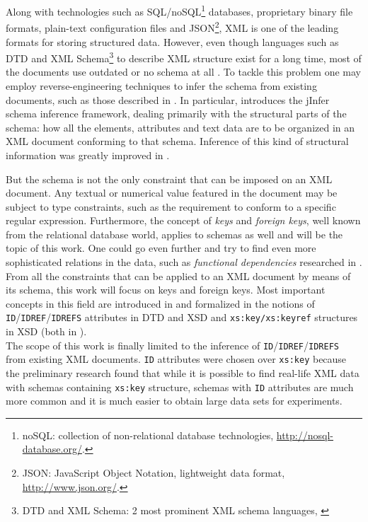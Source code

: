 \label{chapter-preface}

Along with technologies such as SQL/noSQL\footnote{noSQL: collection of non-relational database technologies, \url{http://nosql-database.org/}.} databases, proprietary binary file formats, plain-text configuration files and JSON\footnote{JSON: JavaScript Object Notation, lightweight data format, \url{http://www.json.org/}.}, XML is one of the leading formats for storing structured data. However, even though languages such as DTD and XML Schema\footnote{DTD and XML Schema: 2 most prominent XML schema languages, \cite{Bray:08:EML}} to describe XML structure exist for a long time, most of the documents use outdated or no schema at all \cite{1802522}. To tackle this problem one may employ reverse-engineering techniques to infer the schema from existing documents, such as those described in \cite{ahonen, bex, vyhnanovska}. In particular, \cite{archdoc} introduces the jInfer schema inference framework, dealing primarily with the structural parts of the schema: how all the elements, attributes and text data are to be organized in an XML document conforming to that schema. Inference of this kind of structural information was greatly improved in \cite{anti}.\\


But the schema is not the only constraint that can be imposed on an XML document. Any textual or numerical value featured in the document may be subject to type constraints, such as the requirement to conform to a specific regular expression. Furthermore, the concept of \textit{keys} and \textit{foreign keys}, well known from the relational database world, applies to schemas as well and will be the topic of this work. One could go even further and try to find even more sophisticated relations in the data, such as \textit{functional dependencies} researched in \cite{sviro}.\\

From all the constraints that can be applied to an XML document by means of its schema, this work will focus on keys and foreign keys. Most important concepts in this field are introduced in \cite{keX} and formalized in the notions of \texttt{ID}/\.\texttt{IDREF}/\.\texttt{IDREFS} attributes in DTD and XSD and \texttt{xs:key/xs:keyref} structures in XSD (both in \cite{Bray:08:EML}).\\

The scope of this work is finally limited to the inference of \texttt{ID}/\.\texttt{IDREF}/\.\texttt{IDREFS} from existing XML documents. \texttt{ID} attributes were chosen over \texttt{xs:key} because the preliminary research found that while it is possible to find real-life XML data with schemas containing \texttt{xs:key} structure, schemas with \texttt{ID} attributes are much more common and it is much easier to obtain large data sets for experiments.

